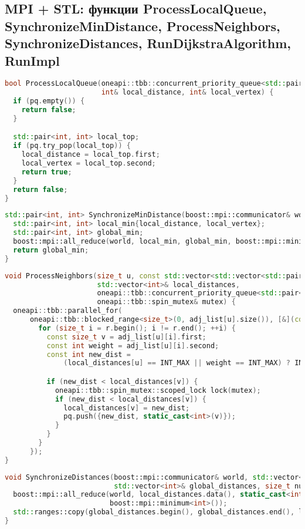 \documentclass[12pt]{article}
\begin{document}
\subsection*{MPI + STL: функции ProcessLocalQueue, SynchronizeMinDistance, ProcessNeighbors, SynchronizeDistances, RunDijkstraAlgorithm, RunImpl}
\begin{lstlisting}[language=C++]
bool ProcessLocalQueue(oneapi::tbb::concurrent_priority_queue<std::pair<int, int>, std::greater<>>& pq,
                       int& local_distance, int& local_vertex) {
  if (pq.empty()) {
    return false;
  }

  std::pair<int, int> local_top;
  if (pq.try_pop(local_top)) {
    local_distance = local_top.first;
    local_vertex = local_top.second;
    return true;
  }
  return false;
}
\end{lstlisting}
\begin{lstlisting}[language=C++]
std::pair<int, int> SynchronizeMinDistance(boost::mpi::communicator& world, int local_distance, int local_vertex) {
  std::pair<int, int> local_min{local_distance, local_vertex};
  std::pair<int, int> global_min;
  boost::mpi::all_reduce(world, local_min, global_min, boost::mpi::minimum<std::pair<int, int>>());
  return global_min;
}
\end{lstlisting}
\begin{lstlisting}[language=C++]
void ProcessNeighbors(size_t u, const std::vector<std::vector<std::pair<size_t, int>>>& adj_list,
                      std::vector<int>& local_distances,
                      oneapi::tbb::concurrent_priority_queue<std::pair<int, int>, std::greater<>>& pq,
                      oneapi::tbb::spin_mutex& mutex) {
  oneapi::tbb::parallel_for(
      oneapi::tbb::blocked_range<size_t>(0, adj_list[u].size()), [&](const oneapi::tbb::blocked_range<size_t>& r) {
        for (size_t i = r.begin(); i != r.end(); ++i) {
          const size_t v = adj_list[u][i].first;
          const int weight = adj_list[u][i].second;
          const int new_dist =
              (local_distances[u] == INT_MAX || weight == INT_MAX) ? INT_MAX : local_distances[u] + weight;

          if (new_dist < local_distances[v]) {
            oneapi::tbb::spin_mutex::scoped_lock lock(mutex);
            if (new_dist < local_distances[v]) {
              local_distances[v] = new_dist;
              pq.push({new_dist, static_cast<int>(v)});
            }
          }
        }
      });
}
\end{lstlisting}
\begin{lstlisting}[language=C++]
void SynchronizeDistances(boost::mpi::communicator& world, std::vector<int>& local_distances,
                          std::vector<int>& global_distances, size_t num_vertices) {
  boost::mpi::all_reduce(world, local_distances.data(), static_cast<int>(num_vertices), global_distances.data(),
                         boost::mpi::minimum<int>());
  std::ranges::copy(global_distances.begin(), global_distances.end(), local_distances.begin());
}
\end{lstlisting}
\end{document}
